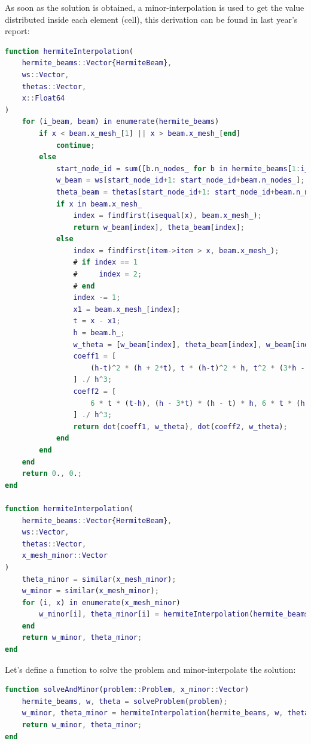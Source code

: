 As soon as the solution is obtained,
a minor-interpolation is used to get the value distributed
inside each element (cell),
this derivation can be found in last year's report:
\begin{lstlisting}[language=matlab]
function hermiteInterpolation(
    hermite_beams::Vector{HermiteBeam},
    ws::Vector,
    thetas::Vector,
    x::Float64
)
    for (i_beam, beam) in enumerate(hermite_beams)
        if x < beam.x_mesh_[1] || x > beam.x_mesh_[end]
            continue;
        else
            start_node_id = sum([b.n_nodes_ for b in hermite_beams[1:i_beam-1]]) - (i_beam - 1);
            w_beam = ws[start_node_id+1: start_node_id+beam.n_nodes_];
            theta_beam = thetas[start_node_id+1: start_node_id+beam.n_nodes_];
            if x in beam.x_mesh_
                index = findfirst(isequal(x), beam.x_mesh_);
                return w_beam[index], theta_beam[index];
            else
                index = findfirst(item->item > x, beam.x_mesh_);
                # if index == 1
                #     index = 2;
                # end
                index -= 1;
                x1 = beam.x_mesh_[index];
                t = x - x1;
                h = beam.h_;
                w_theta = [w_beam[index], theta_beam[index], w_beam[index+1], theta_beam[index+1]];
                coeff1 = [
                    (h-t)^2 * (h + 2*t), t * (h-t)^2 * h, t^2 * (3*h - 2*t), t^2 * (t-h) * h
                ] ./ h^3;
                coeff2 = [
                    6 * t * (t-h), (h - 3*t) * (h - t) * h, 6 * t * (h-t), t * (3*t - 2*h) * h
                ] ./ h^3;
                return dot(coeff1, w_theta), dot(coeff2, w_theta);
            end
        end
    end
    return 0., 0.;
end

function hermiteInterpolation(
    hermite_beams::Vector{HermiteBeam},
    ws::Vector,
    thetas::Vector,
    x_mesh_minor::Vector
)
    theta_minor = similar(x_mesh_minor);
    w_minor = similar(x_mesh_minor);
    for (i, x) in enumerate(x_mesh_minor)
        w_minor[i], theta_minor[i] = hermiteInterpolation(hermite_beams, ws, thetas, x);
    end
    return w_minor, theta_minor;
end
\end{lstlisting}

Let's define a function to solve the problem and minor-interpolate the solution:
\begin{lstlisting}[language=matlab]
function solveAndMinor(problem::Problem, x_minor::Vector)
    hermite_beams, w, theta = solveProblem(problem);
    w_minor, theta_minor = hermiteInterpolation(hermite_beams, w, theta, x_minor);
    return w_minor, theta_minor;
end
\end{lstlisting}

